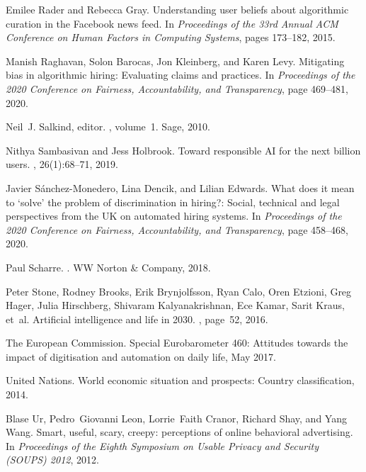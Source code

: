 \documentclass[11pt]{article} %
\begin{document}
\begin{thebibliography}{10}
Emilee Rader and Rebecca Gray.
\newblock Understanding user beliefs about algorithmic curation in the
  {F}acebook news feed.
\newblock In {\em Proceedings of the 33rd Annual ACM Conference on Human
  Factors in Computing Systems}, pages 173--182, 2015.

Manish Raghavan, Solon Barocas, Jon Kleinberg, and Karen Levy.
\newblock Mitigating bias in algorithmic hiring: Evaluating claims and
  practices.
\newblock In {\em Proceedings of the 2020 Conference on Fairness,
  Accountability, and Transparency}, page 469–481, 2020.

Neil~J. Salkind, editor.
, volume~1.
\newblock Sage, 2010.

Nithya Sambasivan and Jess Holbrook.
\newblock Toward responsible {AI} for the next billion users.
, 26(1):68--71, 2019.

Javier S\'{a}nchez-Monedero, Lina Dencik, and Lilian Edwards.
\newblock What does it mean to `solve' the problem of discrimination in
  hiring?: Social, technical and legal perspectives from the {UK} on automated
  hiring systems.
\newblock In {\em Proceedings of the 2020 Conference on Fairness,
  Accountability, and Transparency}, page 458–468, 2020.

Paul Scharre.
.
\newblock WW Norton \& Company, 2018.

Peter Stone, Rodney Brooks, Erik Brynjolfsson, Ryan Calo, Oren Etzioni, Greg
  Hager, Julia Hirschberg, Shivaram Kalyanakrishnan, Ece Kamar, Sarit Kraus,
  et~al.
\newblock Artificial intelligence and life in 2030.
, page~52, 2016.

{The European Commission}.
\newblock Special {E}urobarometer 460: Attitudes towards the impact of
  digitisation and automation on daily life, May 2017.

{United Nations}.
\newblock World economic situation and prospects: Country classification, 2014.

Blase Ur, Pedro~Giovanni Leon, Lorrie~Faith Cranor, Richard Shay, and Yang
  Wang.
\newblock Smart, useful, scary, creepy: perceptions of online behavioral
  advertising.
\newblock In {\em Proceedings of the Eighth Symposium on Usable Privacy and
  Security (SOUPS) 2012}, 2012.


\end{thebibliography}
\end{document}
